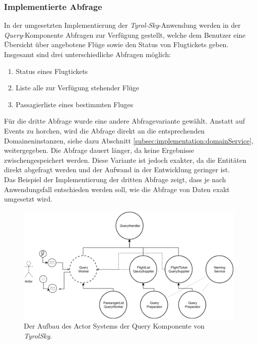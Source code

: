 \subsubsection{Implementierte Abfrage}
In der umgesetzten Implementierung der \textit{Tyrol-Sky}-Anwendung werden in der \textit{Query}-Komponente Abfragen zur Verfügung gestellt, welche dem Benutzer eine Übersicht über angebotene Flüge sowie den Status von Flugtickets geben. Insgesamt sind drei unterschiedliche Abfragen möglich:

\begin{enumerate}
  \item Status eines Flugtickets 
  \item Liste alle zur Verfügung stehender Flüge
  \item Passagierliste eines bestimmten Fluges
\end{enumerate}

Für die dritte Abfrage wurde eine andere Abfragevariante gewählt. Anstatt auf Events zu horchen, wird die Abfrage direkt an die entsprechenden Domaineninstanzen, siehe dazu Abschnitt \ref{subsec:implementation:domainService}, weitergegeben. Die Abfrage dauert länger, da keine Ergebnisse zwischengespeichert werden. Diese Variante ist jedoch exakter, da die Entitäten direkt abgefragt werden und der Aufwand in der Entwicklung geringer ist. \\
Das Beispiel der Implementierung der dritten Abfrage zeigt, dass je nach Anwendungsfall entschieden werden soll, wie die Abfrage von Daten exakt umgesetzt wird.
\begin{figure}
  \centering
  \includegraphics[width=\linewidth]{gfx/implementation/QueringServiceActorModel}
  \caption{Der Aufbau des Actor Systems der Query Komponente von \textit{TyrolSky}.}
  \label{fig:implementation:queryActorModel}
\end{figure} 

